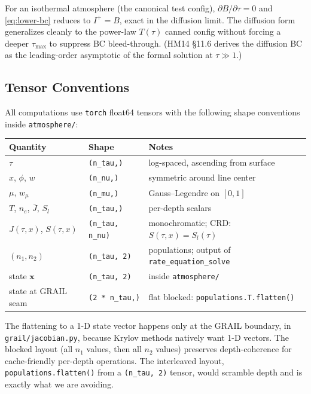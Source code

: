 \documentclass[11pt]{article}
\newcommand{\Jbar}{\bar{J}}
\newcommand{\Sl}{S_{l}}
\newcommand{\code}[1]{\texttt{#1}}
\begin{document}
For an isothermal atmosphere (the canonical test config),
$\partial B/\partial \tau = 0$ and \eqref{eq:lower-bc} reduces to
$I^+ = B$, exact in the diffusion limit.  The diffusion form
generalizes cleanly to the power-law $T(\tau)$ canned config without
forcing a deeper $\tau_{\max}$ to suppress BC bleed-through.  (HM14
§11.6 derives the diffusion BC as the leading-order asymptotic of the
formal solution at $\tau \gg 1$.)

\subsection{Tensor Conventions}

All computations use \code{torch} float64 tensors with the following shape
conventions inside \code{atmosphere/}:

\begin{center}
\begin{tabular}{@{}lll@{}}
\toprule
Quantity & Shape & Notes \\ \midrule
$\tau$ & \code{(n\_tau,)} & log-spaced, ascending from surface \\
$x$, $\phi$, $w$ & \code{(n\_nu,)} & symmetric around line center \\
$\mu$, $w_\mu$ & \code{(n\_mu,)} & Gauss--Legendre on $[0, 1]$ \\
$T$, $n_e$, $\Jbar$, $S_l$ & \code{(n\_tau,)} & per-depth scalars \\
$J(\tau, x)$, $S(\tau, x)$ & \code{(n\_tau, n\_nu)} & monochromatic; CRD: $S(\tau,x)\!=\!\Sl(\tau)$ \\
$(n_1, n_2)$ & \code{(n\_tau, 2)} & populations; output of \code{rate\_equation\_solve} \\
state $\mathbf{x}$ & \code{(n\_tau, 2)} & inside \code{atmosphere/} \\
state at GRAIL seam & \code{(2 * n\_tau,)} & flat blocked: \code{populations.T.flatten()} \\
\bottomrule
\end{tabular}
\end{center}

The flattening to a 1-D state vector happens only at the GRAIL
boundary, in \code{grail/jacobian.py}, because Krylov methods natively
want 1-D vectors.  The blocked layout (all $n_1$ values, then all
$n_2$ values) preserves depth-coherence for cache-friendly per-depth
operations.  The interleaved layout, \code{populations.flatten()} from
a \code{(n\_tau, 2)} tensor, would scramble depth and is exactly what
we are avoiding.
\end{document}
